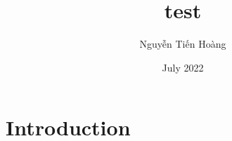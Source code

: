 \documentclass{article}
\title{test}
\author{Nguyễn Tiến Hoàng}
\date{July 2022}
\begin{document}
\maketitle

\section{Introduction}
\end{document}
